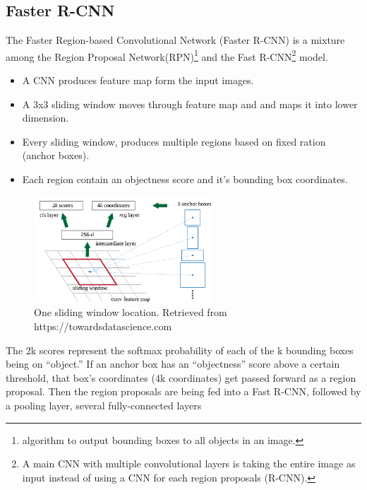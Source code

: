 \documentclass[12pt]{report}
\begin{document}
                \subsection{Faster R-CNN}
                 
                The Faster Region-based Convolutional Network (Faster R-CNN) is a  mixture among  
                the Region Proposal Network(RPN)\footnote{algorithm to output bounding boxes to all objects in an image.} 
                and the Fast R-CNN\footnote{A main CNN with multiple convolutional layers is taking the entire image as input instead of using a CNN for each region proposals (R-CNN).} model.
                \begin{itemize}
                \item A CNN produces feature map form the input images.
                \item A 3x3 sliding window moves through feature map and and maps it into lower dimension.
                \item Every sliding window, produces multiple regions based on fixed ration (anchor boxes).
                \item Each region contain an objectness score and it's bounding box coordinates.
                \end{itemize}
                \begin{figure}[h]
                \centering
                \includegraphics[width=0.6\textwidth]{./images/cfm.png}
                \caption{One sliding window location. Retrieved from https://towardsdatascience.com}
                \label{fig:frcnn}
                \end{figure} 
                The 2k scores represent the softmax probability of each of the k bounding boxes being on “object.”
                If an anchor box has an “objectness” score above a certain threshold, that box’s coordinates (4k coordinates) get passed forward as a region proposal.
                Then the region proposals are being fed into a Fast R-CNN, followed by a pooling layer, several fully-connected layers
\end{document}
